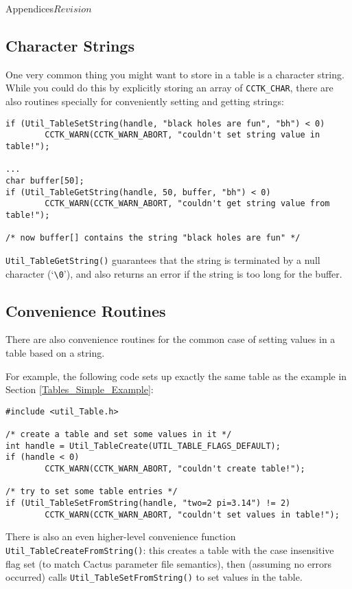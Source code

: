 \begin{cactuspart}{Appendices}{}{$Revision$}

\subsection{Character Strings}

One very common thing you might want to store in a table is a
character string.  While you could do this by explicitly storing
an array of \verb|CCTK_CHAR|, there are also routines
specially for conveniently setting and getting strings:
\begin{verbatim}
if (Util_TableSetString(handle, "black holes are fun", "bh") < 0)
        CCTK_WARN(CCTK_WARN_ABORT, "couldn't set string value in table!");

...
char buffer[50];
if (Util_TableGetString(handle, 50, buffer, "bh") < 0)
        CCTK_WARN(CCTK_WARN_ABORT, "couldn't get string value from table!");

/* now buffer[] contains the string "black holes are fun" */
\end{verbatim}

\verb|Util_TableGetString()| guarantees that the string is
terminated by a null character (`\verb|\0|'), and also returns an
error if the string is too long for the buffer.


\subsection{Convenience Routines}

There are also convenience routines for the common case of setting
values in a table based on a string.

For example, the following code sets up exactly the same table as the
example in Section \ref{Tables_Simple_Example}:

\begin{verbatim}
#include <util_Table.h>

/* create a table and set some values in it */
int handle = Util_TableCreate(UTIL_TABLE_FLAGS_DEFAULT);
if (handle < 0)
        CCTK_WARN(CCTK_WARN_ABORT, "couldn't create table!");

/* try to set some table entries */
if (Util_TableSetFromString(handle, "two=2 pi=3.14") != 2)
        CCTK_WARN(CCTK_WARN_ABORT, "couldn't set values in table!");
\end{verbatim}

There is also an even higher-level convenience function
\verb|Util_TableCreateFromString()|: this creates a table with the
case insensitive flag set (to match Cactus parameter file semantics),
then (assuming no errors occurred) calls \verb|Util_TableSetFromString()|
to set values in the table.


\end{cactuspart}
